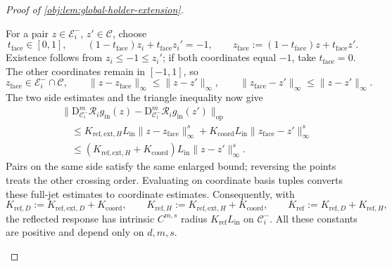 \begin{proof}[Proof of \cref{obj:lem:global-holder-extension}]
\begin{enumerate}
For a pair \(z\in\mathcal E_i^-\), \(z'\in\mathcal C\), choose
\[
t_{\mathrm{face}}\in[0,1],
\qquad
(1-t_{\mathrm{face}})z_i+t_{\mathrm{face}}z_i'=-1,
\qquad
z_{\mathrm{face}}:=(1-t_{\mathrm{face}})z+t_{\mathrm{face}}z'.
\]
Existence follows from \(z_i\le-1\le z_i'\); if both coordinates equal \(-1\), take \(t_{\mathrm{face}}=0\). The other coordinates remain in \([-1,1]\), so
\[
z_{\mathrm{face}}\in\mathcal E_i^-\cap\mathcal C,
\qquad
\|z-z_{\mathrm{face}}\|_\infty\le\|z-z'\|_\infty,
\qquad
\|z_{\mathrm{face}}-z'\|_\infty\le\|z-z'\|_\infty.
\]
The two side estimates and the triangle inequality now give
\[
\begin{aligned}
&\|\mathrm D_{\mathcal C_i^-}^m\mathscr R_i g_{\mathrm{in}}(z)
-\mathrm D_{\mathcal C_i^-}^m\mathscr R_i g_{\mathrm{in}}(z')\|_{\mathrm{op}}\\
&\quad\le
K_{\mathrm{ref},\mathrm{ext},H}L_{\mathrm{in}}
\|z-z_{\mathrm{face}}\|_\infty^s
+K_{\mathrm{coord}}L_{\mathrm{in}}
\|z_{\mathrm{face}}-z'\|_\infty^s\\
&\quad\le
(K_{\mathrm{ref},\mathrm{ext},H}+K_{\mathrm{coord}})
L_{\mathrm{in}}\|z-z'\|_\infty^s.
\end{aligned}
\]
Pairs on the same side satisfy the same enlarged bound; reversing the points treats the other crossing order. Evaluating on coordinate basis tuples converts these full-jet estimates to coordinate estimates. Consequently, with
\[
K_{\mathrm{ref},D}
:=K_{\mathrm{ref},\mathrm{ext},D}+K_{\mathrm{coord}},
\qquad
K_{\mathrm{ref},H}
:=K_{\mathrm{ref},\mathrm{ext},H}+K_{\mathrm{coord}},
\qquad
K_{\mathrm{ref}}:=K_{\mathrm{ref},D}+K_{\mathrm{ref},H},
\]
the reflected response has intrinsic \(C^{m,s}\) radius
\(K_{\mathrm{ref}}L_{\mathrm{in}}\) on \(\mathcal C_i^-\). All these constants are positive and depend only on \(d,m,s\).


\end{enumerate}
\end{proof}
